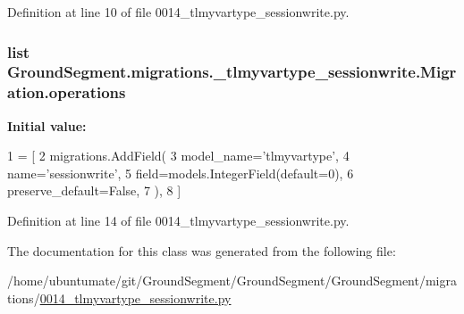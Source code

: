 Definition at line 10 of file 0014\+\_\+tlmyvartype\+\_\+sessionwrite.\+py.

\hypertarget{class_ground_segment_1_1migrations_1_10014__tlmyvartype__sessionwrite_1_1_migration_a52b37bc36d253846ab5629616264650b}{}
\subsubsection[{operations}]{\setlength{\rightskip}{0pt plus 5cm}list Ground\+Segment.\+migrations.\+\_\+tlmyvartype\+\_\+sessionwrite.\+Migration.\+operations\hspace{0.3cm}{\ttfamily [static]}}\label{class_ground_segment_1_1migrations_1_10014__tlmyvartype__sessionwrite_1_1_migration_a52b37bc36d253846ab5629616264650b}
{\bfseries Initial value\+:}
\begin{DoxyCode}
1 = [
2         migrations.AddField(
3             model\_name=\textcolor{stringliteral}{'tlmyvartype'},
4             name=\textcolor{stringliteral}{'sessionwrite'},
5             field=models.IntegerField(default=0),
6             preserve\_default=\textcolor{keyword}{False},
7         ),
8     ]
\end{DoxyCode}


Definition at line 14 of file 0014\+\_\+tlmyvartype\+\_\+sessionwrite.\+py.



The documentation for this class was generated from the following file\+:\begin{DoxyCompactItemize}
\item 
/home/ubuntumate/git/\+Ground\+Segment/\+Ground\+Segment/\+Ground\+Segment/migrations/\hyperlink{0014__tlmyvartype__sessionwrite_8py}{0014\+\_\+tlmyvartype\+\_\+sessionwrite.\+py}\end{DoxyCompactItemize}
